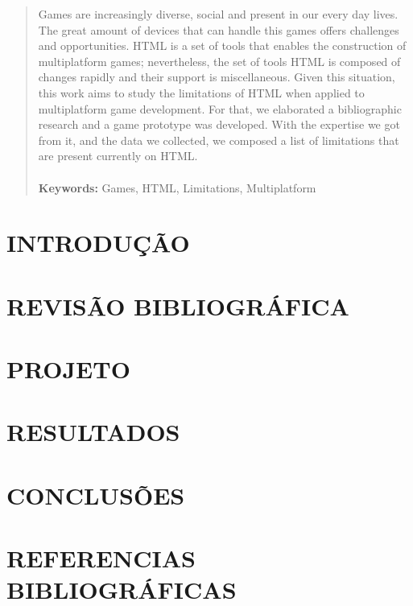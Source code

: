 \documentclass[
12pt,
a4paper,
portuges,
]{report}
\newcounter{limitation}
\begin{document}
\newpage

\renewcommand{\abstractname}{\Large\bfseries ABSTRACT}
\begin{abstract}
{
Games are increasingly diverse, social and present in our every day
lives. The great amount of devices that can handle this games offers
challenges and opportunities. HTML is a set of tools that enables the
construction of multiplatform games; nevertheless, the set of tools
HTML is composed of changes rapidly and their support is miscellaneous.
Given this situation, this work aims to study the limitations of HTML
when applied to multiplatform game development. For that, we elaborated
a bibliographic research and a game prototype was developed. With the
expertise we got from it, and the data we collected, we composed a list
of limitations that are present currently on HTML.
}
\\
\\
{\bfseries Keywords:} Games, HTML, Limitations, Multiplatform
\end{abstract}

{\listoffigures}
\clearpage
{\tableofcontents}
\chapter{INTRODUÇÃO}%


\chapter{REVISÃO BIBLIOGRÁFICA}

\chapter{PROJETO}
\thispagestyle{myheadings}

\chapter{RESULTADOS}
\thispagestyle{myheadings}

\chapter{CONCLUSÕES}
\thispagestyle{myheadings}


\chapter{REFERENCIAS BIBLIOGRÁFICAS}
\markboth{}{}
\printbibliography[heading=none]
% 
% 
\markboth{}{}
\begin{appendices}

\end{appendices}
\end{document}
